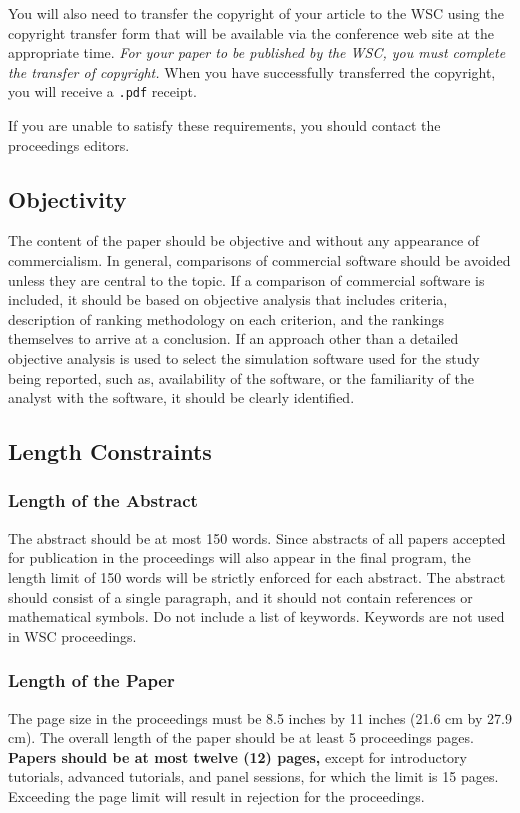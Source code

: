 \documentclass{wscpaperproc}
\theoremstyle{wsc}
\begin{document}
You will also need to transfer the copyright of your article to the WSC using the copyright transfer form that will be available via the conference web site at the appropriate time. {\em For your paper to be published by the WSC, you must complete the transfer of copyright.}
When you have successfully transferred the copyright, you will receive a {\tt .pdf} receipt.

If you are unable to satisfy these requirements, you should contact the proceedings editors.

\subsection{Objectivity}
The content of the paper should be objective and without any appearance of commercialism. In general, comparisons of commercial software should be avoided unless they are central to the topic. If a comparison of commercial software is included, it should be based on objective analysis that includes criteria, description of ranking methodology on each criterion, and the rankings themselves to arrive at a conclusion. If an approach other than a detailed objective analysis is used to select the simulation software used for the study being reported, such as, availability of the software, or the familiarity of the analyst with the software, it should be clearly identified.

\subsection{Length Constraints}

\subsubsection{Length of the Abstract}
The abstract should be at most 150 words. Since abstracts of all papers accepted for publication in the proceedings will also appear in the final program, the length limit of 150 words will be strictly enforced for each abstract. The abstract should consist of a single paragraph, and it should not contain references or mathematical symbols. Do not include a list of keywords. Keywords are not used in WSC proceedings.

\subsubsection{Length of the Paper}
The page size in the proceedings must be 8.5 inches by 11 inches (21.6 cm by 27.9 cm). The overall length of the paper should be at least 5 proceedings pages. \textbf{Papers should be at most twelve (12) pages,} except for introductory tutorials, advanced tutorials, and panel sessions, for which the limit is 15 pages. Exceeding the page limit will result in rejection for the proceedings.
\end{document}

